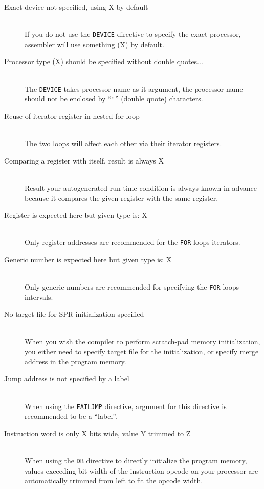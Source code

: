 \begin{description}
        \item[Exact device not specified, using X by default]~\\
            If you do not use the \texttt{DEVICE} directive to specify the exact processor, assembler will use something (X) by default.
        \item[Processor type (X) should be specified without double quotes...]~\\
            The \texttt{DEVICE} takes processor name as it argument, the processor name should not be enclosed by ``\texttt{"}'' (double quote) characters.
        \item[Reuse of iterator register in nested for loop]~\\
            The two loops will affect each other via their iterator registers.
        \item[Comparing a register with itself, result is always X]~\\
            Result your autogenerated run-time condition is always known in advance because it compares the given register with the same register.
        \item[Register is expected here but given type is: X]~\\
            Only register addresses are recommended for the \texttt{FOR} loops iterators.
        \item[Generic number is expected here but given type is: X]~\\
            Only generic numbers are recommended for specifying the \texttt{FOR} loops intervals.
        \item[No target file for SPR initialization specified]~\\
            When you wish the compiler to perform scratch-pad memory initialization, you either need to specify target file for the initialization, or specify merge address in the program memory.
        \item[Jump address is not specified by a label]~\\
            When using the \texttt{FAILJMP} directive, argument for this directive is recommended to be a ``label''.
        \item[Instruction word is only X bits wide, value Y trimmed to Z]~\\
            When using the \texttt{DB} directive to directly initialize the program memory, values exceeding bit width of the instruction opcode on your processor are automatically trimmed from left to fit the opcode width.
    \end{description}
